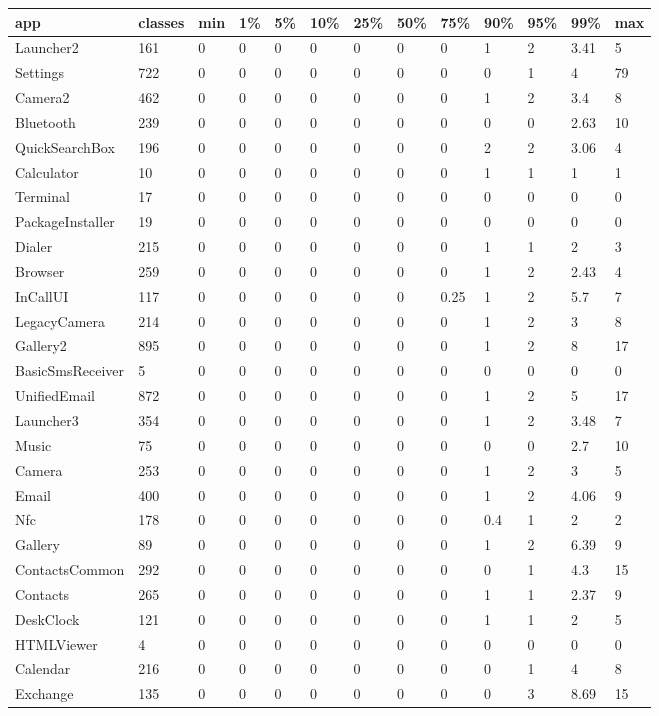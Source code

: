 \begin{tabular}{|l|l|l|l|l|l|l|l|l|l|l|l|l|}
\hline
app&classes&min&1\%&5\%&10\%&25\%&50\%&75\%&90\%&95\%&99\%&max\\
\hline
Launcher2&161&0&0&0&0&0&0&0&1&2&3.41&5\\
\hline
Settings&722&0&0&0&0&0&0&0&0&1&4&79\\
\hline
Camera2&462&0&0&0&0&0&0&0&1&2&3.4&8\\
\hline
Bluetooth&239&0&0&0&0&0&0&0&0&0&2.63&10\\
\hline
QuickSearchBox&196&0&0&0&0&0&0&0&2&2&3.06&4\\
\hline
Calculator&10&0&0&0&0&0&0&0&1&1&1&1\\
\hline
Terminal&17&0&0&0&0&0&0&0&0&0&0&0\\
\hline
PackageInstaller&19&0&0&0&0&0&0&0&0&0&0&0\\
\hline
Dialer&215&0&0&0&0&0&0&0&1&1&2&3\\
\hline
Browser&259&0&0&0&0&0&0&0&1&2&2.43&4\\
\hline
InCallUI&117&0&0&0&0&0&0&0.25&1&2&5.7&7\\
\hline
LegacyCamera&214&0&0&0&0&0&0&0&1&2&3&8\\
\hline
Gallery2&895&0&0&0&0&0&0&0&1&2&8&17\\
\hline
BasicSmsReceiver&5&0&0&0&0&0&0&0&0&0&0&0\\
\hline
UnifiedEmail&872&0&0&0&0&0&0&0&1&2&5&17\\
\hline
Launcher3&354&0&0&0&0&0&0&0&1&2&3.48&7\\
\hline
Music&75&0&0&0&0&0&0&0&0&0&2.7&10\\
\hline
Camera&253&0&0&0&0&0&0&0&1&2&3&5\\
\hline
Email&400&0&0&0&0&0&0&0&1&2&4.06&9\\
\hline
Nfc&178&0&0&0&0&0&0&0&0.4&1&2&2\\
\hline
Gallery&89&0&0&0&0&0&0&0&1&2&6.39&9\\
\hline
ContactsCommon&292&0&0&0&0&0&0&0&0&1&4.3&15\\
\hline
Contacts&265&0&0&0&0&0&0&0&1&1&2.37&9\\
\hline
DeskClock&121&0&0&0&0&0&0&0&1&1&2&5\\
\hline
HTMLViewer&4&0&0&0&0&0&0&0&0&0&0&0\\
\hline
Calendar&216&0&0&0&0&0&0&0&0&1&4&8\\
\hline
Exchange&135&0&0&0&0&0&0&0&0&3&8.69&15\\
\hline
\end{tabular}
